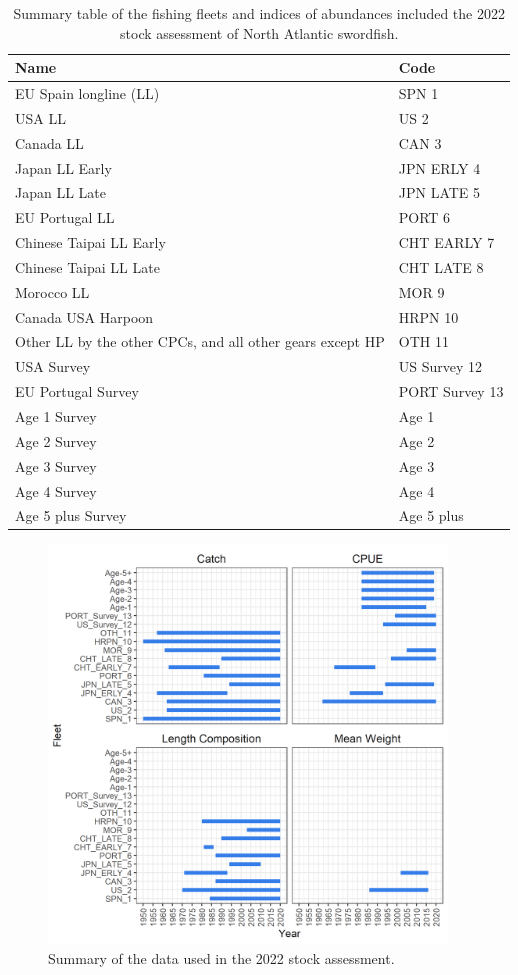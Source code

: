 \documentclass[
]{article}
\begin{document}
\begin{table}

\caption{\label{tab:fleet-info}Summary table of the fishing fleets and indices of abundances included the 2022 stock assessment of North Atlantic swordfish.}
\centering
\begin{tabu} to 
\toprule
Name & Code\\
\midrule
EU Spain longline (LL) & SPN 1\\
USA LL & US 2\\
Canada LL & CAN 3\\
Japan LL   Early & JPN ERLY 4\\
Japan LL   Late & JPN LATE 5\\
\addlinespace
EU Portugal LL & PORT 6\\
Chinese Taipai LL   Early & CHT EARLY 7\\
Chinese Taipai LL   Late & CHT LATE 8\\
Morocco LL & MOR 9\\
Canada USA Harpoon & HRPN 10\\
\addlinespace
Other   LL by the other CPCs, and all other gears except HP & OTH 11\\
USA Survey & US Survey 12\\
EU Portugal Survey & PORT Survey 13\\
Age 1 Survey & Age 1\\
Age 2 Survey & Age 2\\
\addlinespace
Age 3 Survey & Age 3\\
Age 4 Survey & Age 4\\
Age 5 plus Survey & Age 5 plus\\
\bottomrule
\end{tabu}
\end{table}

\begin{figure}
\includegraphics[width=400px]{../../img/Data_overview} \caption{Summary of the data used in the 2022 stock assessment.}\label{fig:data-fig}
\end{figure}
\end{document}
